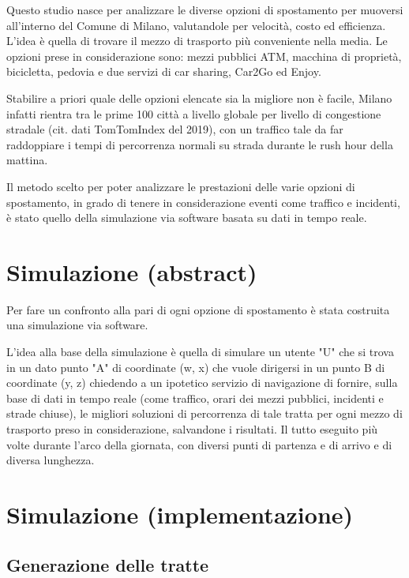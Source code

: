 Questo studio nasce per analizzare le diverse opzioni di spostamento per muoversi all'interno del Comune di Milano, valutandole per velocità, costo ed efficienza. L'idea è quella di trovare il mezzo di trasporto più conveniente nella media. Le opzioni prese in considerazione sono: mezzi pubblici ATM, macchina di proprietà, bicicletta, pedovia e due servizi di car sharing, Car2Go ed Enjoy.

Stabilire a priori quale delle opzioni elencate sia la migliore non è facile, Milano infatti rientra tra le prime 100 città a livello globale per livello di congestione stradale (cit. dati TomTomIndex del 2019), con un traffico tale da far raddoppiare i tempi di percorrenza normali su strada durante le rush hour della mattina.

Il metodo scelto per poter analizzare le prestazioni delle varie opzioni di spostamento, in grado di tenere in considerazione eventi come traffico e incidenti, è stato quello della simulazione via software basata su dati in tempo reale.



\section{Simulazione (abstract)}

Per fare un confronto alla pari di ogni opzione di spostamento è stata costruita una simulazione via software.

L'idea alla base della simulazione è quella di simulare un utente "U" che si trova in un dato punto "A" di coordinate (w, x) che vuole dirigersi in un punto B di coordinate (y, z) chiedendo a un ipotetico servizio di navigazione di fornire, sulla base di dati in tempo reale (come traffico, orari dei mezzi pubblici, incidenti e strade chiuse), le migliori soluzioni di percorrenza di tale tratta per ogni mezzo di trasporto preso in considerazione, salvandone i risultati. Il tutto eseguito più volte durante l'arco della giornata, con diversi punti di partenza e di arrivo e di diversa lunghezza.



\section{Simulazione (implementazione)}

\subsection{Generazione delle tratte}

